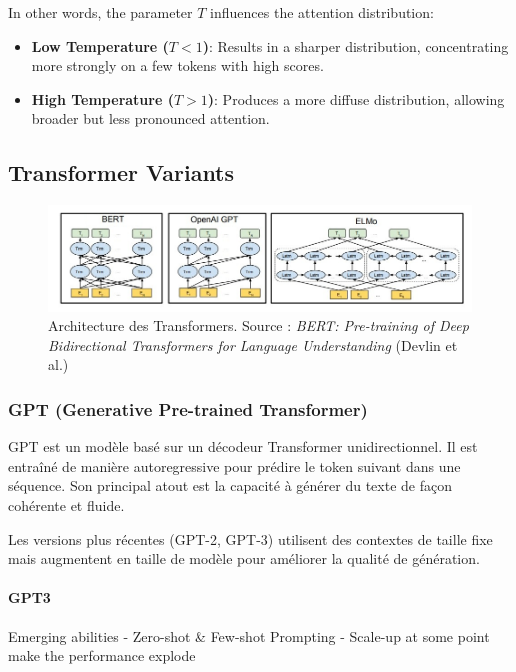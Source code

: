 \documentclass{article}
\begin{document}
In other words, the parameter \( T \) influences the attention distribution:
\begin{itemize}
    \item \textbf{Low Temperature (\( T < 1 \))}: Results in a sharper distribution, concentrating more strongly on a few tokens with high scores.
    \item \textbf{High Temperature (\( T > 1 \))}: Produces a more diffuse distribution, allowing broader but less pronounced attention.
\end{itemize}


\subsection{Transformer Variants}
\begin{figure}[h!]
    \centering
    \includegraphics[width=\linewidth]{graphics/transformers_architectures.jpg}
    \caption{Architecture des Transformers. Source : \textit{BERT: Pre-training of Deep Bidirectional Transformers for Language Understanding} (Devlin et al.)}
    \label{fig:transformers_architecture}
\end{figure}

\subsubsection{GPT (Generative Pre-trained Transformer)}
GPT est un modèle basé sur un décodeur Transformer unidirectionnel. Il est entraîné de manière autoregressive pour prédire le token suivant dans une séquence. Son principal atout est la capacité à générer du texte de façon cohérente et fluide.

Les versions plus récentes (GPT-2, GPT-3) utilisent des contextes de taille fixe mais augmentent en taille de modèle pour améliorer la qualité de génération.

\paragraph{GPT3}

Emerging abilities 
- Zero-shot \& Few-shot Prompting
- Scale-up at some point make the performance explode
\end{document}

